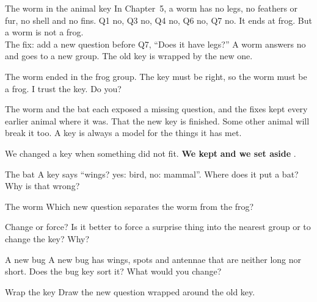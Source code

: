 \begin{worked}{The worm in the animal key}
In Chapter~5, a worm has no legs, no feathers or fur, no shell and no fins. Q1 no, Q3 no, Q4 no, Q6 no, Q7 no. It ends at frog. But a worm is not a frog.\\
The fix: add a new question before Q7, ``Does it have legs?'' A worm answers no and goes to a new group. The old key is wrapped by the new one.
\end{worked}

\begin{multix}[hmm]\multixbot[hmm]\tcblower
The worm ended in the frog group. The key must be right, so the worm must be a frog. I trust the key. Do you?
\end{multix}

{The worm and the bat each exposed a missing question, and the fixes kept every earlier animal where it was.}
{That the new key is finished. Some other animal will break it too. A key is always a model for the things it has met.}

\begin{keepbox}
We changed a key when something did not fit. \textbf{We kept} \wline[3.4cm] \textbf{and we set aside} \wline[3.4cm].
\end{keepbox}

\clearpage

\begin{puzzle}{The bat}
A key says ``wings? yes: bird, no: mammal''. Where does it put a bat? \wline[3cm] Why is that wrong? \wline[5cm]
\end{puzzle}

\begin{puzzle}{The worm}
Which new question separates the worm from the frog? \wline[6cm]
\end{puzzle}

\begin{puzzle}{Change or force?}
Is it better to force a surprise thing into the nearest group or to change the key? \wline[3cm] Why? \wline[4cm]
\end{puzzle}

\begin{puzzle}{A new bug}
A new bug has wings, spots and antennae that are neither long nor short. Does the bug key sort it? \wline[2cm] What would you change? \wline[4cm]
\end{puzzle}

\begin{puzzle}{Wrap the key}
Draw the new question wrapped around the old key.
\begin{center}\end{center}
\end{puzzle}

